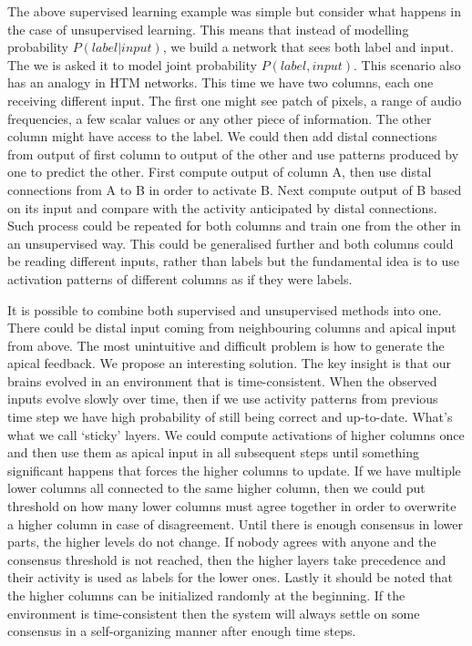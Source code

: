\documentclass[12pt]{article}
\begin{document}
The above supervised learning example was simple but consider what happens in the case of unsupervised learning. This means that instead of modelling probability $P(label|input)$, we build a network that sees both label and input. The we is asked it to model joint probability $P(label, input)$. This scenario also has an analogy in HTM networks. This time we have two columns, each one receiving different input. The first one might see
patch of pixels, a range of audio frequencies, a few scalar values or any other piece of information. The other column might have access to the label. We could then add distal connections from output of first column to output of the other and use patterns produced by one to predict the other. First compute output of column A, then use distal connections from A to B in order to activate B. Next compute output of B based on its input and compare with the activity anticipated by distal connections. Such process could be repeated for both columns and train one from the other in an unsupervised way. This could be generalised further and both columns could be reading different inputs, rather than labels but the fundamental idea is to use activation patterns of different columns as if they were labels.

It is possible to combine both supervised and unsupervised methods into one. There could be distal input coming from neighbouring columns and apical input from above. The most unintuitive and difficult problem is how to generate the apical feedback. We propose an interesting solution. The key insight is that our brains evolved in an environment that is time-consistent. When the observed inputs evolve slowly over time, then if we use activity patterns from previous time step we have high probability of still being correct and up-to-date. What's what we call `sticky' layers. We could compute activations of higher columns once and then use them as apical input in all subsequent steps until something significant happens that forces the higher columns to update. If we have multiple lower columns all connected to the same higher column, then we could put threshold on how many lower columns must agree together in order to overwrite a higher column in case of disagreement. Until there is enough consensus in lower parts, the higher levels do not change. If nobody agrees with anyone and the consensus threshold is not reached, then the higher layers take precedence and their activity is used as labels for the lower ones.
Lastly it should be noted that the higher columns can be initialized randomly at the beginning. If the environment is time-consistent then the system will always settle on some consensus in a self-organizing manner after enough time steps.
\end{document}
